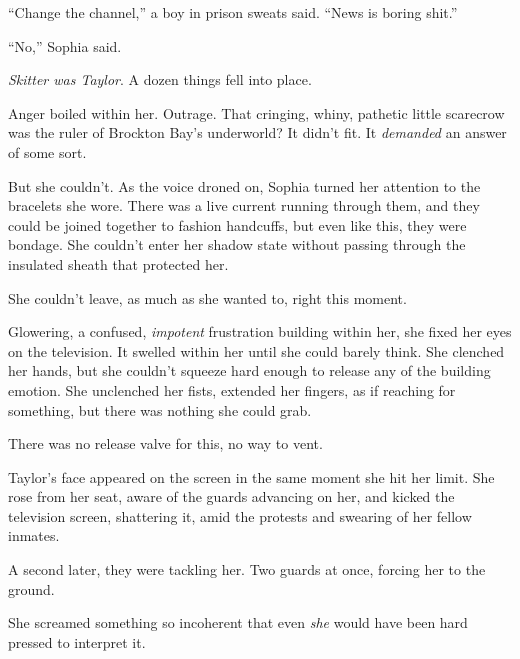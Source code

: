 ``Change the channel,'' a boy in prison sweats said.  ``News is boring shit.''



``No,'' Sophia said.



\emph{Skitter was Taylor}.  A dozen things fell into place.



Anger boiled within her.  Outrage.  That cringing, whiny, pathetic little scarecrow was the ruler of Brockton Bay's underworld?  It didn't fit.  It \emph{demanded} an answer of some sort.



But she couldn't.  As the voice droned on, Sophia turned her attention to the bracelets she wore.  There was a live current running through them, and they could be joined together to fashion handcuffs, but even like this, they were bondage.  She couldn't enter her shadow state without passing through the insulated sheath that protected her.



She couldn't leave, as much as she wanted to, right this moment.



Glowering, a confused, \emph{impotent} frustration building within her, she fixed her eyes on the television.  It swelled within her until she could barely think.  She clenched her hands, but she couldn't squeeze hard enough to release any of the building emotion.  She unclenched her fists, extended her fingers, as if reaching for something, but there was nothing she could grab.



There was no release valve for this, no way to vent.



Taylor's face appeared on the screen in the same moment she hit her limit.  She rose from her seat, aware of the guards advancing on her, and kicked the television screen, shattering it, amid the protests and swearing of her fellow inmates.



A second later, they were tackling her.  Two guards at once, forcing her to the ground.



She screamed something so incoherent that even \emph{she} would have been hard pressed to interpret it.



\sectionbreak



